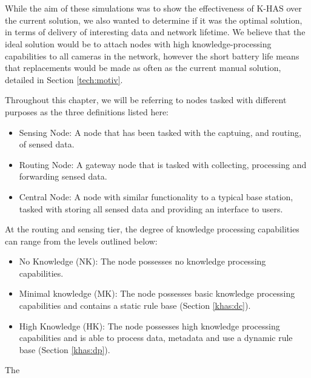 \section{\DIFdelbegin {}\DIFdelend \DIFaddbegin {}\DIFaddend }\DIFdelbegin %
\DIFdelend \DIFaddbegin \label{sim:scen}
\DIFaddend While the aim of these simulations was to show the effectiveness of K-HAS over the current solution, we also wanted to determine if it was the optimal solution, in terms of delivery of interesting data and network lifetime. We believe that the ideal solution would be to attach nodes with high knowledge-processing capabilities to all cameras in the network, however the short battery life means that replacements would be made as often as the current manual solution, detailed in Section \ref{tech:motiv}.

Throughout this chapter, we will be referring to nodes tasked with different purposes as the three definitions listed here:
	\begin{itemize}
		\item Sensing Node: A node that has been tasked with the captuing, and routing, of sensed data.
		\item Routing Node: A gateway node that is tasked with collecting, processing and forwarding sensed data.
		\item Central Node: A node with similar functionality to a typical base station, tasked with storing all sensed data and providing an interface to users.
	\end{itemize}

At the routing and sensing tier, the degree of knowledge processing capabilities can range from the levels outlined below:

	\begin{itemize}
		\item No Knowledge (NK): The node possesses no knowledge processing capabilities.
		\item Minimal knowledge (MK): The node possesses basic knowledge processing capabilities and contains a static rule base (Section \ref{khas:dc}).
		\item High Knowledge (HK): The node possesses high knowledge processing capabilities and is able to process data, metadata and use a dynamic rule base (Section \ref{khas:dp}).
	\end{itemize}

The \DIFaddbegin {}

